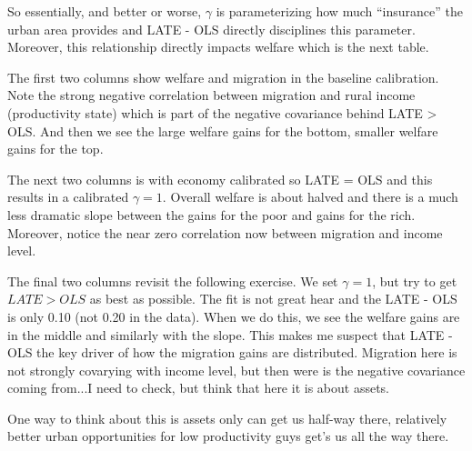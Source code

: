 \documentclass[pdftex,11pt]{article}
\begin{document}
So essentially, and better or worse, $\gamma$ is parameterizing how much ``insurance'' the urban area provides and LATE - OLS directly disciplines this parameter. Moreover, this relationship directly impacts  welfare which is the next table.

The first two columns show welfare and migration in the baseline calibration. Note the strong negative correlation between migration and rural income (productivity state) which is part of the negative covariance behind LATE > OLS. And then we see the large welfare gains for the bottom, smaller welfare gains for the top.

The next two columns is with economy calibrated so LATE = OLS and this results in a calibrated $\gamma = 1$. Overall welfare is about halved and there is a much less dramatic slope between the gains for the poor and gains for the rich. Moreover, notice the near zero correlation now between migration and income level.

The final two columns revisit the following exercise. We set $\gamma = 1$, but try to get $LATE > OLS$ as best as possible. The fit is not great hear and the LATE - OLS is only 0.10 (not 0.20 in the data). When we do this, we see the welfare gains are in the middle and similarly with the slope. This makes me suspect that LATE - OLS the key driver of how the migration gains are distributed. Migration here is not strongly covarying with income level, but then were is the negative covariance coming from...I need to check, but think that here it is about assets. 

One way to think about this is assets only can get us half-way there, relatively better urban opportunities for low productivity guys get's us all the way there. 
\end{document}
